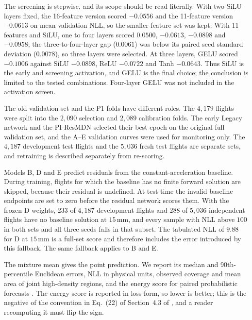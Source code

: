 \documentclass[11pt,a4paper]{article}
\begin{document}
The screening is stepwise, and its scope should be read literally. With two SiLU layers fixed, the 16-feature version scored $-0.0556$ and the 11-feature version $-0.0613$ on mean validation NLL, so the smaller feature set was kept. With 11 features and SiLU, one to four layers scored $0.0500$, $-0.0613$, $-0.0898$ and $-0.0958$; the three-to-four-layer gap ($0.0061$) was below its paired seed standard deviation ($0.0078$), so three layers were selected. At three layers, GELU scored $-0.1006$ against SiLU $-0.0898$, ReLU $-0.0722$ and Tanh $-0.0643$. Thus SiLU is the early and screening activation, and GELU is the final choice; the conclusion is limited to the tested combinations. Four-layer GELU was not included in the activation screen.

The old validation set and the P1 folds have different roles. The $4{,}179$ flights were split into the $2{,}090$ selection and $2{,}089$ calibration folds. The early Legacy network and the PI-ResMDN selected their best epoch on the original full validation set, and the A--E validation curves were used for monitoring only. The $4{,}187$ development test flights and the $5{,}036$ fresh test flights are separate sets, and retraining is described separately from re-scoring.

Models B, D and E predict residuals from the constant-acceleration baseline. During training, flights for which the baseline has no finite forward solution are skipped, because their residual is undefined. At test time the invalid baseline endpoints are set to zero before the residual network scores them. With the frozen D weights, $233$ of $4{,}187$ development flights and $288$ of $5{,}036$ independent flights have no baseline solution at $15\,\mathrm{mm}$, and every sample with NLL above $100$ in both sets and all three seeds falls in that subset. The tabulated NLL of $9.88$ for D at $15\,\mathrm{mm}$ is a full-set score and therefore includes the error introduced by this fallback. The same fallback applies to B and E.

The mixture mean gives the point prediction. We report its median and 90th-percentile Euclidean errors, NLL in physical units, observed coverage and mean area of joint high-density regions, and the energy score for paired probabilistic forecasts \cite{gneiting2007}. The energy score is reported in loss form, so lower is better; this is the negative of the convention in Eq.~(22) of Section~4.3 of \cite{gneiting2007}, and a reader recomputing it must flip the sign.
\end{document}
